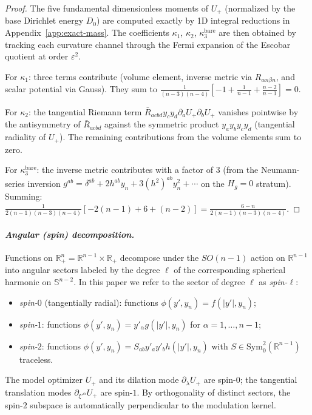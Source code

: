 \documentclass[11pt,reqno,a4paper]{amsart}
\newcommand{\R}{\mathbb{R}}
\numberwithin{equation}{section}
\theoremstyle{plain}
\theoremstyle{remark}
\theoremstyle{plain}
\begin{document}
\begin{proof}
The five fundamental dimensionless moments of $U_+$
(normalized by the base Dirichlet energy $D_0$)
are computed exactly by 1D integral reductions in Appendix~\ref{app:exact-mass}.
The coefficients $\kappa_1$, $\kappa_2$, $\kappa_3^{\mathrm{bare}}$ are then obtained
by tracking each curvature channel through the Fermi expansion of the Escobar quotient
at order $\varepsilon^2$.

For $\kappa_1$: three terms contribute (volume element, inverse metric via $R_{\alpha n\beta n}$,
and scalar potential via Gauss). They sum to
$\frac{1}{(n-3)(n-4)}[-1 + \frac{1}{n-1} + \frac{n-2}{n-1}] = 0$.

For $\kappa_2$: the tangential Riemann term $\bar{R}_{acbd}y_cy_d\partial_aU_+\partial_bU_+$
vanishes pointwise by the antisymmetry of $\bar{R}_{acbd}$ against the symmetric product
$y_ay_by_cy_d$ (tangential radiality of $U_+$).
The remaining contributions from the volume elements sum to zero.

For $\kappa_3^{\mathrm{bare}}$: the inverse metric contributes with a factor of $3$
(from the Neumann-series inversion $g^{ab} = \delta^{ab} + 2h^{ab}y_n + 3(h^2)^{ab}y_n^2 + \cdots$
on the $H_g=0$ stratum). Summing:
$\frac{1}{2(n-1)(n-3)(n-4)}[-2(n-1) + 6 + (n-2)] = \frac{6-n}{2(n-1)(n-3)(n-4)}$.
\end{proof}

\paragraph{\emph{Angular (spin) decomposition.}}
Functions on $\R^n_+=\R^{n-1}\times\R_+$ decompose under the $SO(n-1)$ action on $\R^{n-1}$ into angular sectors labeled by the degree $\ell$ of the corresponding spherical harmonic on $\mathbb S^{n-2}$. In this paper we refer to the sector of degree $\ell$ as \emph{spin-$\ell$}:
\begin{itemize}
\item \emph{spin-$0$} (tangentially radial): functions $\phi(y',y_n)=f(|y'|,y_n)$;
\item \emph{spin-$1$}: functions $\phi(y',y_n)=y'_\alpha g(|y'|,y_n)$ for $\alpha=1,\dots,n-1$;
\item \emph{spin-$2$}: functions $\phi(y',y_n)=S_{ab}y'_ay'_bh(|y'|,y_n)$ with $S\in\mathrm{Sym}^2_0(\R^{n-1})$ traceless.
\end{itemize}
The model optimizer $U_+$ and its dilation mode $\partial_\lambda U_+$ are spin-$0$; the tangential translation modes $\partial_{\xi'^\alpha}U_+$ are spin-$1$. By orthogonality of distinct sectors, the spin-$2$ subspace is automatically perpendicular to the modulation kernel.
\end{document}

